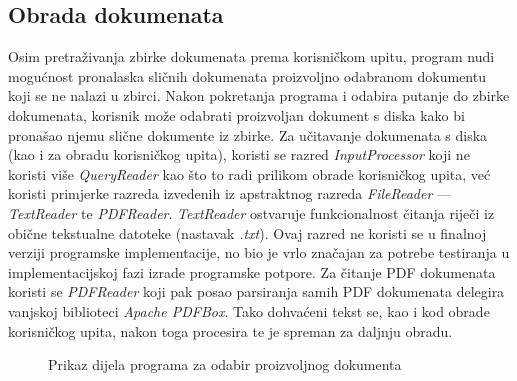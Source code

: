\documentclass[times, utf8, zavrsni, numeric]{fer}
\begin{document}
\subsection{Obrada dokumenata}
Osim pretraživanja zbirke dokumenata prema korisničkom upitu, program nudi mogućnost pronalaska sličnih dokumenata proizvoljno odabranom dokumentu koji se ne nalazi u zbirci. Nakon pokretanja programa i odabira putanje do zbirke dokumenata, korisnik može odabrati proizvoljan dokument s diska kako bi pronašao njemu slične dokumente iz zbirke. Za učitavanje dokumenata s diska (kao i za obradu korisničkog upita), koristi se razred \textit{InputProcessor} koji ne koristi više \textit{QueryReader} kao što to radi prilikom obrade korisničkog upita, već koristi primjerke razreda izvedenih iz apstraktnog razreda \textit{FileReader} — \textit{TextReader} te \textit{PDFReader}. \textit{TextReader} ostvaruje funkcionalnost čitanja riječi iz obične tekstualne datoteke (nastavak \textit{.txt}). Ovaj razred ne koristi se u finalnoj verziji programske implementacije, no bio je vrlo značajan za potrebe testiranja u implementacijskoj fazi izrade programske potpore. Za čitanje PDF dokumenata koristi se \textit{PDFReader} koji pak posao parsiranja samih PDF dokumenata delegira vanjskoj biblioteci \textit{Apache PDFBox}. Tako dohvaćeni tekst se, kao i kod obrade korisničkog upita, nakon toga procesira te je spreman za daljnju obradu.
\begin{figure}
\caption{Prikaz dijela programa za odabir proizvoljnog dokumenta}
\label{img:doc_search}
\end{figure}
\end{document}

